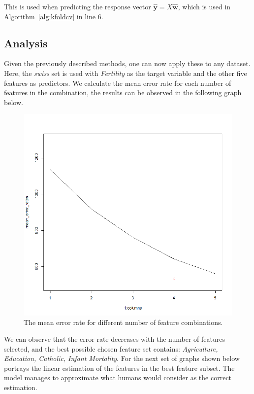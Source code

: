 \documentclass[a4paper, twocolumn]{article}
\begin{document}
            This is used when predicting the response vector $\hat{\mathbf{y}} = X \hat{\mathbf{w}}$, which is used in Algorithm~\ref{alg:kfoldcv} in line 6.

    \subsection*{Analysis}

        Given the previously described methods, one can now apply these to any dataset. Here, the \emph{swiss} set is used with \emph{Fertility} as the target variable and the other five features as predictors. We calculate the mean error rate for each number of features in the combination, the results can be observed in the following graph below.

        \begin{figure}[H]
        \centering
        \begin{minipage}[]{0.35\textwidth}
        \includegraphics[width=\textwidth]{share/Lab2A1_me_features.png}  
        \caption{The mean error rate for different number of feature combinations.\label{fig:features} }
        \end{minipage}
        \end{figure}

        We can observe that the error rate decreases with the number of features selected, and the best possible chosen feature set contains: \emph{Agriculture, Education, Catholic, Infant Mortality}. For the next set of graphs shown below portrays the linear estimation of the features in the best feature subset. The model manages to approximate what humans would consider as the correct estimation.
\end{document}

